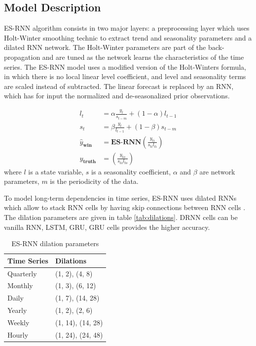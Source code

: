 \documentclass{article}
\begin{document}
\subsection{Model Description}

ES-RNN algorithm consists in two major layers: a preprocessing layer which uses Holt-Winter smoothing technic to extract trend and seasonality parameters and a dilated RNN network.
The Holt-Winter parameters are part of the back-propagation and are tuned as the network learns the characteristics of the time series. The ES-RNN model uses a modified version of the Holt-Winters formula,
in which there is no local linear level coefficient, and level and seasonality terms are scaled instead of subtracted. 
The linear forecast is replaced by an RNN, which has for input the normalized and de-seasonalized prior observations. 


\begin{align*}
	l_t 	&= \alpha \frac{y_t} {s_{t-m}} + (1-\alpha) l_{t-1} \\
	s_t 	&= \beta \frac{y_t}{l_{t-1}} + (1-\beta) s_{t-m} \\
	\hat{y}_{\textbf{win}}		&= \textbf{ES-RNN}(\frac{y_{ti}}{s_{ti} l_{ti}}) \\
	y_{\textbf{truth}}		&= (\frac{y_{to}}{s_{to} l_{to}}) 
\end{align*}
where $l$ is a state variable, $s$ is a seasonality coefficient, $\alpha$ and $\beta$ are network parameters, $m$ is the periodicity of the data.

To model long-term dependencies in time series, ES-RNN uses dilated RNNs which allow to stack RNN cells by having skip connections between RNN cells . 
The dilation parameters  are given in table \autoref{tab:dilations}.  DRNN cells can be vanilla RNN, LSTM, GRU,  GRU cells provides the higher accuracy.

\begin{table}[!ht]
	\centering
	\begin{tabular}{ll} \toprule
		\textbf{Time Series} & \textbf{Dilations} \\ 
		\midrule
		Quarterly  & (1, 2), (4, 8)	\\
		\midrule
		Monthly 	& (1, 3), (6, 12)	\\
		\midrule
		Daily 	& (1, 7), (14, 28)	\\
		\midrule		
		Yearly 	& (1, 2), (2, 6) 	\\
		\midrule		
		Weekly 	& (1, 14), (14, 28)	\\
		\midrule		
		Hourly 	& (1, 24), (24, 48)	\\
	\end{tabular}
	\label{tab:dilations}
	\caption{ES-RNN dilation parameters}
\end{table}
\end{document}
